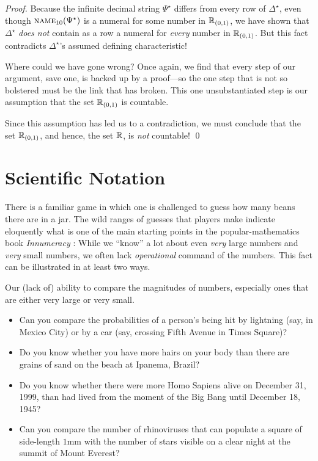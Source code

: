 \begin{proof}
\smallskip

Because the infinite decimal string $\Psi^\star$ differs from every row of $\Delta^\star$, even though $\mbox{\sc name}_{10}(\Psi^\star)$ is a numeral for some number in $\mathbb{R}_{(0,1)}$, we
have shown that $\Delta^\star$ {\em does not} contain as a row a numeral for {\em every} number in $\mathbb{R}_{(0,1)}$.  But this fact contradicts $\Delta^\star$'s assumed defining characteristic!

\medskip

Where could we have gone wrong?  Once again, we find that every step of our argument, save one, is backed up by a proof---so the one step that is not so bolstered must be the link that has broken.  This one unsubstantiated step is our assumption that the set $\mathbb{R}_{(0,1)}$ is countable.  

\medskip

Since this assumption has led us to a contradiction, we must conclude that the set $\mathbb{R}_{(0,1)}$, and hence, the set $\mathbb{R}$, is {\em not} countable!  \qed
\end{proof}



\section{Scientific Notation}
\label{sec:scientific-notation}

There is a familiar game in which one is challenged to guess how many beans there are in a jar.  The wild ranges of guesses that players make indicate eloquently what is one of the main starting points in the popular-mathematics book {\it Innumeracy} \cite{Paulos}: While we ``know''
a lot about even {\em very} large numbers and {\em very} small numbers, we often lack {\em operational} command of the numbers.  This fact can be illustrated in at least two ways.

\bigskip

Our (lack of) ability to compare the magnitudes of numbers, especially ones that are either very large or very small.
\begin{itemize}
\item
Can you compare the probabilities of a person's being hit by lightning (say, in Mexico City) or by a car (say, crossing Fifth Avenue in Times Square)?
\item
Do you know whether you have more hairs on your body than there are grains of sand on the beach at Ipanema, Brazil?
\item
Do you know whether there were more Homo Sapiens alive on December 31, 1999, than had lived from the moment of the Big Bang until December 18, 1945?
\item
Can you compare the number of rhinoviruses that can populate a square of side-length $1$mm with the number of stars visible on a clear night at the summit of Mount Everest?
\end{itemize}

